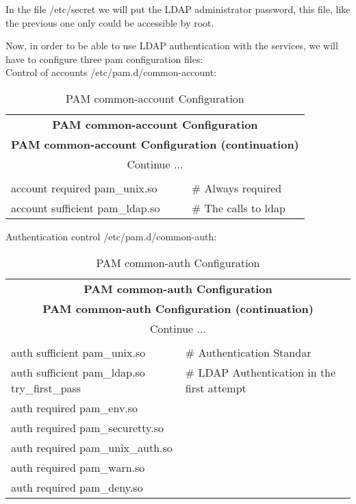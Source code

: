 In the file /etc/secret we will put the LDAP administrator password, this file, like the previous one only could be accessible by root.

Now, in order to be able to use LDAP authentication with the services, we will have to configure three pam configuration files:\\
Control of accounts /etc/pam.d/common-account:
\begin{center}
\begin{longtable}{|ll|}\hline
\caption{PAM common-account Configuration}\\
\hline \hline
\multicolumn{2}{|c|}{\textbf{PAM common-account Configuration}}\\
\hline \hline
\endfirsthead
\hline \hline
\multicolumn{2}{|c|}{\textbf{PAM common-account Configuration (continuation)}}\\
\hline \hline
\endhead
\hline
\multicolumn{2}{|c|}{Continue $\ldots$}\\
\hline
\endfoot
\hline
\multicolumn{2}{|c|}{\textbf{End}}\\
\hline
\endlastfoot
account required          pam\_unix.so & \# Always required\\
account sufficient        pam\_ldap.so & \# The calls to ldap\\
\end{longtable}
\end{center}


Authentication control /etc/pam.d/common-auth:
\begin{center}
\begin{longtable}{|ll|}\hline
\caption{PAM common-auth Configuration}\\
\hline \hline
\multicolumn{2}{|c|}{\textbf{PAM common-auth Configuration}}\\
\hline \hline
\endfirsthead
\hline \hline
\multicolumn{2}{|c|}{\textbf{PAM common-auth Configuration (continuation)}}\\
\hline \hline
\endhead
\hline
\multicolumn{2}{|c|}{Continue $\ldots$}\\
\hline
\endfoot
\hline
\multicolumn{2}{|c|}{\textbf{End}}\\
\hline
\endlastfoot
auth     sufficient     pam\_unix.so & \# Authentication Standar\\
auth     sufficient     pam\_ldap.so try\_first\_pass & \# LDAP Authentication in the first attempt\\
auth     required       pam\_env.so & \\
auth     required       pam\_securetty.so & \\
auth     required       pam\_unix\_auth.so & \\
auth     required       pam\_warn.so & \\
auth     required       pam\_deny.so & \\
\end{longtable}
\end{center}



